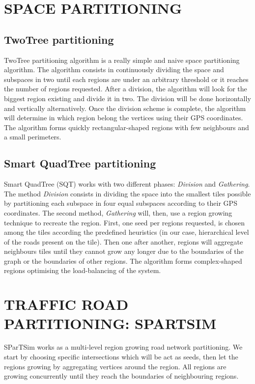 \section{SPACE PARTITIONING}
\label{sec:spacePart}

\subsection{TwoTree partitioning}

TwoTree partitioning algorithm is a really simple and naive space partitioning algorithm. The algorithm consists in continuously dividing the space and subspaces in two until each regions are under an arbitrary threshold or it reaches the number of regions requested. After a division, the algorithm will look for the biggest region existing and divide it in two. The division will be done horizontally and vertically alternatively. Once the division scheme is complete, the algorithm will determine in which region belong the vertices using their GPS coordinates. The algorithm forms quickly rectangular-shaped regions with few neighbours and a small perimeters.

\subsection{Smart QuadTree partitioning}

Smart QuadTree (SQT) works with two different phases: \textit{Division} and \textit{Gathering}. The method \textit{Division} consists in dividing the space into the smallest tiles possible by partitioning each subspace in four equal subspaces according to their GPS coordinates. The second method, \textit{Gathering} will, then, use a region growing technique to recreate the region. First, one seed per regions requested, is chosen among the tiles according the predefined heuristics (in our case, hierarchical level of the roads present on the tile). Then one after another, regions will aggregate neighbours tiles until they cannot grow any longer due to the boundaries of the graph or the boundaries of other regions. The algorithm forms complex-shaped regions optimising the load-balancing of the system.

\section{TRAFFIC ROAD PARTITIONING: SPARTSIM}
\label{sec:spartsim}

SParTSim works as a multi-level region growing road network partitioning.
We start by choosing specific intersections which will be act as seeds, then let the regions growing by aggregating vertices around the region. All regions are growing concurrently until they reach the boundaries of neighbouring regions. 

